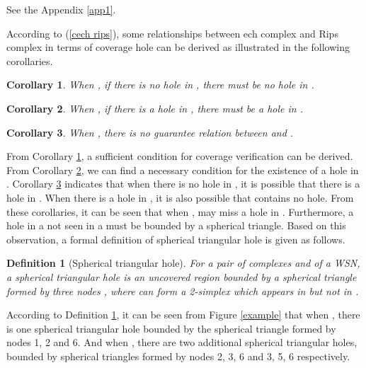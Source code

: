 \documentclass[journal, twoside]{IEEEtran}
\newtheorem{definition}{Definition}
\newtheorem{corollary}{Corollary}
\begin{document}
\begin{IEEEproof}
 See the Appendix \ref{app1}.
\end{IEEEproof}

According to (\ref{cech rips}), some relationships between ech 
complex and Rips complex in terms of coverage hole can be derived as illustrated in 
the following corollaries.

\begin{corollary} \label{CRcase1}
When , if there is no hole in 
, there must be no hole in 
.
\end{corollary}



\begin{corollary} \label{CRcase2}
When , if there is a hole in , 
there must be a hole in .
\end{corollary}



\begin{corollary} \label{CRcase3}
When , there is no guarantee
relation between  and .
\end{corollary}

From Corollary \ref{CRcase1}, a sufficient condition for coverage verification
can be derived. From Corollary \ref{CRcase2}, we can find a necessary condition for 
the existence of a hole in . Corollary
\ref{CRcase3} indicates that when there is no hole in ,
it is possible that there is a hole in . When there
is a hole in , it is also possible that  contains no hole. 
From these corollaries, it can be seen that when , 
 may miss a hole in .
Furthermore, a hole in a 
not seen in a  must be bounded by a spherical triangle. 
Based on this observation, a formal definition of spherical triangular hole is given as follows.

\begin{definition}[Spherical triangular hole]\label{trihole}
For a pair of complexes  and 
 of a WSN, a spherical triangular hole is an uncovered 
region bounded by a spherical triangle formed by three nodes , where 
 can form a 2-simplex which appears in  
but not in .
\end{definition}

According to Definition \ref{trihole}, it can be seen from Figure \ref{example}
that when , there is one spherical triangular hole bounded by the spherical
triangle formed by nodes 1, 2 and 6. And when , there are two additional
spherical triangular holes, bounded by spherical triangles formed by nodes
2, 3, 6 and 3, 5, 6 respectively.
\end{document}
